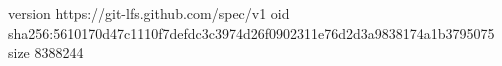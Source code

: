 version https://git-lfs.github.com/spec/v1
oid sha256:5610170d47c1110f7defdc3c3974d26f0902311e76d2d3a9838174a1b3795075
size 8388244
